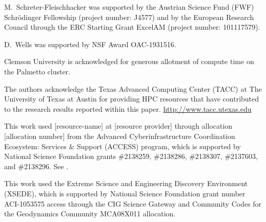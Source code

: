 \documentclass{ansarticle-preprint}
\begin{document}
M.~Schreter-Fleischhacker was supported by the Austrian Science Fund (FWF) Schrödinger Fellowship (project number: J4577) and by the European Research Council
through the ERC Starting Grant ExcelAM (project number: 101117579).

D.~Wells was supported by NSF Award OAC-1931516.

Clemson University is acknowledged for generous allotment of compute
time on the Palmetto cluster.

The authors acknowledge the Texas Advanced Computing Center (TACC) at The University of Texas at Austin for providing HPC resources that have contributed to the research results reported within this paper. \url{http://www.tacc.utexas.edu}


This work used [resource-name] at [resource provider] through allocation [allocation number] from the Advanced Cyberinfrastructure Coordination Ecosystem: Services \& Support (ACCESS) program, which is supported by National Science Foundation grants \#2138259, \#2138286, \#2138307, \#2137603, and \#2138296. See \cite{Boerner2023}.


This work used the Extreme Science and Engineering Discovery Environment (XSEDE), which is supported by National Science Foundation grant number ACI-1053575 access through the CIG Science Gateway and Community Codes for the Geodynamics Community MCA08X011 allocation.


{}

\end{document}
